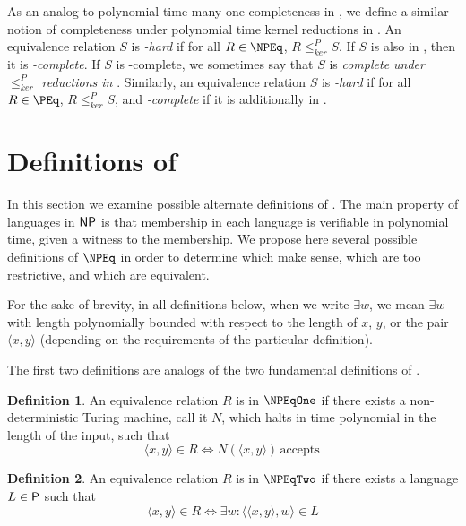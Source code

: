 \documentclass[draft]{article}
\theoremstyle{definition} \newtheorem{openproblem}[openproblem]{Open problem}
\theoremstyle{definition} \newtheorem{definition}[definition]{Definition}
\theoremstyle{remark} \newtheorem{remark}[remark]{Remark}
\newcommand{\plain}[1]{\,\text{#1}\,} %
\newcommand{\kr}{\leq^{P}_{ker}} %
\newcommand{\defn}[1]{\emph{#1}} %
\newcommand{\pair}[2]{\langle#1,#2\rangle} %
\begin{document}
As an analog to polynomial time many-one completeness in \NP, we define a similar notion of completeness under polynomial time kernel reductions in \NPEq.
An equivalence relation $S$ is \defn{\NPEq-hard} if for all $R\in\NPEq$, $R\kr S$.
If $S$ is also in \NPEq, then it is \defn{\NPEq-complete}.
If $S$ is \NPEq-complete, we sometimes say that $S$ is \defn{complete under $\kr$ reductions in \NPEq}.
Similarly, an equivalence relation $S$ is \defn{\PEq-hard} if for all $R\in\PEq$, $R\kr S$, and \defn{\PEq-complete} if it is additionally in \PEq.

\section{Definitions of \texorpdfstring{\NPEq}{NPEq}}\label{sec:definitions}

In this section we examine possible alternate definitions of \NPEq.
The main property of languages in $\NP$ is that membership in each language is verifiable in polynomial time, given a witness to the membership.
We propose here several possible definitions of $\NPEq$ in order to determine which make sense, which are too restrictive, and which are equivalent.

For the sake of brevity, in all definitions below, when we write $\exists w$, we mean $\exists w$ with length polynomially bounded with respect to the length of $x$, $y$, or the pair $\pair{x}{y}$ (depending on the requirements of the particular definition).

The first two definitions are analogs of the two fundamental definitions of \NP.
\begin{definition}\label{def:npeq1}
  An equivalence relation $R$ is in $\NPEqOne$ if there exists a non-deterministic Turing machine, call it $N$, which halts in time polynomial in the length of the input, such that
  \begin{displaymath}
    \pair{x}{y}\in R\iff N(\pair{x}{y})\plain{accepts}
  \end{displaymath}
\end{definition}
\begin{definition}\label{def:npeq2}
  An equivalence relation $R$ is in $\NPEqTwo$ if there exists a language $L\in\P$ such that
  \begin{displaymath}
    \pair{x}{y}\in R\iff \exists w\colon \pair{\pair{x}{y}}{w}\in L
  \end{displaymath}
\end{definition}
\end{document}
